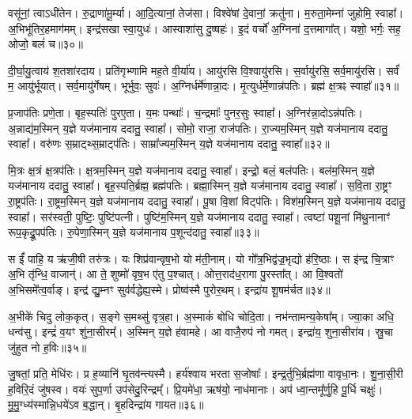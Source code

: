 वसू॑नां॒ त्वा\-ऽधी॑तेन।
रु॒द्राणा॑मू॒र्म्या।
आ॒दि॒त्यानां॒ तेज॑सा।
विश्वे॑षां दे॒वानां॒ क्रतु॑ना।
म॒रुता॒मेम्ना॑ जुहोमि॒ स्वाहा᳚।
अ॒भि\-भू॑ति\-र॒हमाग॑मम्।
इन्द्र॑सखा स्वा॒युधः॑।
आस्वाशा॑सु दु॒ष्षहः॑।
इ॒दं वर्चो॑ अ॒ग्निना॑ द॒त्तमागा᳚त्।
यशो॒ भर्गः॒ सह॒ ओजो॒ बलं॑ च॥३०॥

दी॒र्घा॒यु॒त्वाय॑ श॒तशा॑रदाय।
प्रति॑\-गृभ्णामि मह॒ते वी॒र्या॑य।
आयु॑रसि वि॒श्वायु॑रसि।
स॒र्वायु॑रसि॒ सर्व॒मायु॑रसि।
सर्वं॑ म॒ आयु॑र्भूयात्।
सर्व॒मायु॑र्गेषम्।
भूर्भुवः॒ सुवः॑।
अ॒ग्निर्धर्मे॑णान्ना॒दः।
मृ॒त्युर्धर्मे॒णान्न॑पतिः।
ब्रह्म॑ क्ष॒त्रꣴ स्वाहा᳚॥३१॥

प्र॒जा\-प॑तिः प्रणे॒ता।
बृह॒स्पतिः॑ पुरए॒ता।
य॒मः पन्थाः᳚।
च॒न्द्रमाः᳚ पुनर॒सुः स्वाहा᳚।
अ॒ग्निर॑न्ना॒दो\-ऽन्न॑पतिः।
अ॒न्नाद्य॑म॒स्मिन् य॒ज्ञे यज॑मानाय ददातु॒ स्वाहा᳚।
सोमो॒ राजा॒ राज॑पतिः।
रा॒ज्यम॒स्मिन् य॒ज्ञे यज॑मानाय ददातु॒ स्वाहा᳚।
वरु॑णः स॒म्राट्थ्स॒म्राट्प॑तिः।
साम्रा᳚ज्यम॒स्मिन् य॒ज्ञे यज॑मानाय ददातु॒ स्वाहा᳚॥३२॥

मि॒त्रः क्ष॒त्रं क्ष॒त्रप॑तिः।
क्ष॒त्रम॒स्मिन् य॒ज्ञे यज॑मानाय ददातु॒ स्वाहा᳚।
इन्द्रो॒ बलं॒ बल॑पतिः।
बल॑म॒स्मिन् य॒ज्ञे यज॑मानाय ददातु॒ स्वाहा᳚।
बृह॒स्पति॒र्ब्रह्म॒ ब्रह्म॑पतिः।
ब्रह्मा॒स्मिन् य॒ज्ञे यज॑मानाय ददातु॒ स्वाहा᳚।
स॒वि॒ता रा॒ष्ट्रꣳ रा॒ष्ट्रप॑तिः।
रा॒ष्ट्रम॒स्मिन् य॒ज्ञे यज॑मानाय ददातु॒ स्वाहा᳚।
पू॒षा वि॒शां विट्प॑तिः।
विश॑म॒स्मिन् य॒ज्ञे यज॑मानाय ददातु॒ स्वाहा᳚।
सर॑स्वती॒ पुष्टिः॒ पुष्टि॑पत्नी।
पुष्टि॑म॒स्मिन् य॒ज्ञे यज॑मानाय ददातु॒ स्वाहा᳚।
त्वष्टा॑ पशू॒नां मि॑थु॒नानाꣳ॑ रूप॒कृद्रू॒पप॑तिः।
रु॒पेणा॒स्मिन् य॒ज्ञे यज॑मानाय प॒शून्द॑दातु॒ स्वाहा᳚॥३३॥\anuvakamend[च॒ स्वाहा॒ साम्रा᳚ज्यम॒स्मिन् य॒ज्ञे यज॑मानाय ददातु॒ स्वाहा॒ विश॑म॒स्मिन् य॒ज्ञे यज॑मानाय ददातु॒ स्वाहा॑ च॒त्वारि॑ च (अ॒ग्निः सोमो॒ वरु॑णो मि॒त्र इन्द्रो॒ बृह॒स्पतिः॑ सवि॒ता पू॒षा सर॑स्वती॒ त्वष्टा॒ दश॑॥)]

स ईं᳚ पाहि॒ य ऋ॑जी॒षी तरु॑त्रः।
यः शिप्र॑वान्वृष॒भो यो म॑ती॒नाम्।
यो गो᳚त्र॒भिद्व॑ज्र॒भृद्यो ह॑रि॒ष्ठाः।
स इ॑न्द्र चि॒त्राꣳ अ॒भि तृ॑न्धि॒ वाजान्॑।
आ ते॒ शुष्मो॑ वृष॒भ ए॑तु प॒श्चात्।
ओत्त॒राद॑ध॒रागा पु॒रस्ता᳚त्।
आ वि॒श्वतो॑ अ॒भिसमे᳚त्व॒र्वाङ्।
इन्द्र॑ द्यु॒म्नꣳ सुव॑र्वद्धेह्य॒स्मे।
प्रोष्व॑स्मै पुरोर॒थम्।
इन्द्रा॑य शू॒षम॑र्चत॥३४॥

अ॒भीके॑ चिदु लोक॒कृत्।
स॒ङ्गे स॒मथ्सु॑ वृत्र॒हा।
अ॒स्माकं॑ बोधि चोदि॒ता।
नभ॑न्तामन्य॒केषा᳚म्।
ज्या॒का अधि॒ धन्व॑सु।
इन्द्रं॑ व॒यꣳ शु॑ना॒सीरम्᳚।
अ॒स्मिन् य॒ज्ञे ह॑वामहे।
आ वाजै॒रुप॑ नो गमत्।
इन्द्रा॑य॒ शुना॒सीरा॑य।
स्रु॒चा जु॑हुत नो ह॒विः॥३५॥

जु॒षतां॒ प्रति॒ मेधि॑रः।
प्र ह॒व्यानि॑ घृ॒तव॑न्त्यस्मै।
हर्य॑श्वाय भरता स॒जोषाः᳚।
इन्द्र॒र्तुभि॒र्ब्रह्म॑णा वावृधा॒नः।
शु॒ना॒सी॒री ह॒विरि॒दं जु॑षस्व।
वयः॑ सुप॒र्णा उप॑सेदु॒रिन्द्रम्᳚।
प्रि॒यमे॑धा॒ ऋष॑यो॒ नाध॑मानाः।
अप॑ ध्वा॒न्तमू᳚र्णु॒हि पू॒र्धि चक्षुः॑।
मु॒मु॒ग्ध्य॑स्मान्नि॒धये॑ऽव ब॒द्धान्।
बृ॒हदिन्द्रा॑य गायत॥३६॥

